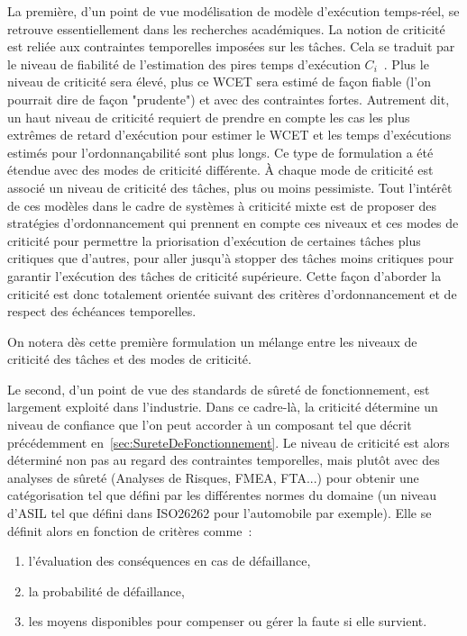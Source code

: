 \documentclass[french, a4paper, 11pt, twoside, pdftex]{StyleThese}
\begin{document}
    La première, d'un point de vue modélisation de modèle d'exécution temps-réel, se retrouve essentiellement dans les recherches académiques. La notion de criticité est reliée aux contraintes temporelles imposées sur les tâches. Cela se traduit par le niveau de fiabilité de l'estimation des pires temps d'exécution $C_i$~\cite{vestal_preemptive_2007}. 
    Plus le niveau de criticité sera élevé, plus ce WCET sera estimé de façon fiable (l'on pourrait dire de façon "prudente") et avec des contraintes fortes. Autrement dit, un haut niveau de criticité requiert de prendre en compte les cas les plus extrêmes de retard d'exécution pour estimer le WCET et les temps d'exécutions estimés pour l'ordonnançabilité sont plus longs. Ce type de formulation a été étendue avec des modes de criticité différente. À chaque mode de criticité est associé un niveau de criticité des tâches, plus ou moins pessimiste.
    Tout l'intérêt de ces modèles  dans le cadre de systèmes à criticité mixte est de proposer des stratégies d'ordonnancement qui prennent en compte ces niveaux et ces modes de criticité pour permettre la priorisation d'exécution de certaines tâches plus critiques que d'autres, pour aller jusqu'à stopper des tâches moins critiques pour garantir l'exécution des tâches de criticité supérieure. Cette façon d'aborder la criticité est donc totalement orientée suivant des critères d'ordonnancement et de respect des échéances temporelles.
    
    On notera dès cette première formulation un mélange entre les niveaux de criticité des tâches et des modes de criticité. 

    Le second, d'un point de vue des standards de sûreté de fonctionnement, est largement exploité dans l'industrie. Dans ce cadre-là, la criticité détermine un niveau de confiance que l'on peut accorder à un composant tel que décrit précédemment en~\autoref{sec:SureteDeFonctionnement}. Le niveau de criticité est alors déterminé non pas au regard des contraintes temporelles, mais plutôt avec des analyses de sûreté (Analyses de Risques, FMEA, FTA...) pour obtenir une catégorisation tel que défini par les différentes normes du domaine (un niveau d'ASIL tel que défini dans ISO26262 pour l'automobile par exemple). Elle se définit alors en fonction de critères comme~: 
\begin{enumerate}[label=\textbf{\alph*)}]
	\item     l'évaluation des conséquences en cas de défaillance, 
	\item     la probabilité de défaillance, 
	\item     les moyens disponibles pour compenser ou gérer la faute si elle survient.
\end{enumerate}
\end{document}
